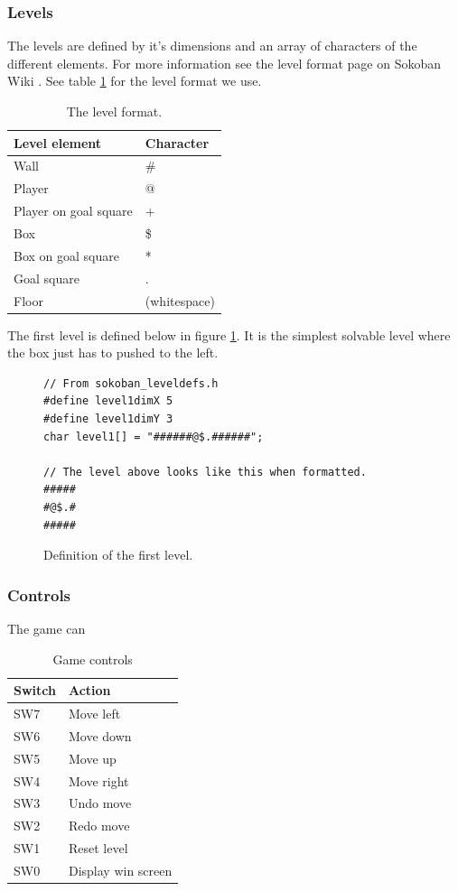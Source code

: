 \documentclass[a4paper,11pt]{article}
\begin{document}
\subsubsection{Levels}
The levels are defined by it's dimensions and an array of characters of the different elements. For more information see the level format page on Sokoban Wiki \cite{sokobanlevel}. See table \ref{tab:levelformat} for the level format we use.

\begin{table}[h]
\centering
\begin{tabular}{|l|l|}
\hline \textbf{Level element} & \textbf{Character} \\ 
\hline Wall & \# \\ 
\hline Player & @ \\ 
\hline Player on goal square & + \\ 
\hline Box & \$ \\ 
\hline Box on goal square & * \\ 
\hline Goal square & . \\ 
\hline Floor & (whitespace) \\ 
\hline 
\end{tabular}
\caption{The level format.}
\label{tab:levelformat}
\end{table}

The first level is defined below in figure \ref{fig:leveldef}. It is the simplest solvable level where the box just has to pushed to the left.
\begin{figure}[h]
\begin{lstlisting}
// From sokoban_leveldefs.h
#define level1dimX 5
#define level1dimY 3
char level1[] = "######@$.######";

// The level above looks like this when formatted.
#####
#@$.#
#####
\end{lstlisting}
\caption{Definition of the first level.}
\label{fig:leveldef}
\end{figure}

\subsubsection{Controls}
The game can 
\begin{table}[h]
\centering
\begin{tabular}{|l|l|}
\hline \textbf{Switch} & \textbf{Action} \\ 
\hline SW7 & Move left \\ 
\hline SW6 & Move down \\ 
\hline SW5 & Move up \\ 
\hline SW4 & Move right \\ 
\hline SW3 & Undo move \\ 
\hline SW2 & Redo move \\ 
\hline SW1 & Reset level \\ 
\hline SW0 & Display win screen \\ 
\hline 
\end{tabular}
\caption{Game controls} 
\label{tab:gamecontrols}
\end{table}
\end{document}
